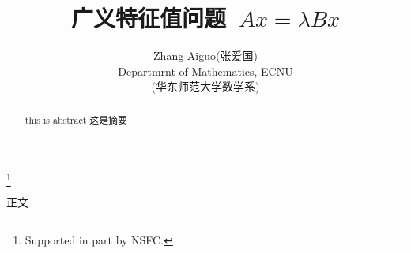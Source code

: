 \documentclass{article}
\begin{document}
\begin{CJK*}{GBK}{song} \CJKtilde
\title{广义特征值问题~$Ax = \lambda Bx$}
\thanks{Supported in part by NSFC.}
\author{Zhang Aiguo(张爱国)\\[5pt] Departmrnt of Mathematics, ECNU\\(华东师范大学数学系)}
\date{}
\maketitle
\renewcommand{\abstractname}{摘\qquad 要}
\begin{abstract}
this is abstract {这是摘要}
\end{abstract}
正文
\newpage
\end{CJK*}
\end{document}
